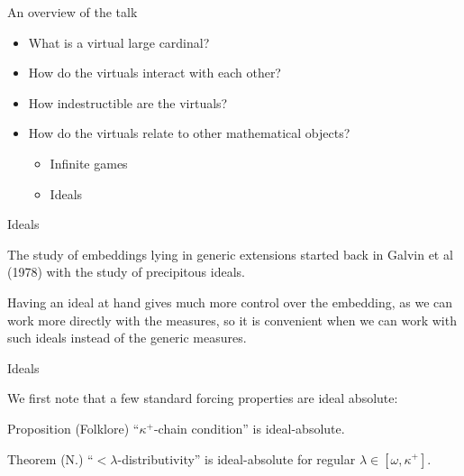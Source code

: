 \documentclass{beamer}
\begin{document}
\begin{frame}{An overview of the talk}
  \begin{itemize}
    \item What is a virtual large cardinal?
    \item How do the virtuals interact with each other?
    \item How indestructible are the virtuals?
    \item How do the virtuals relate to other mathematical objects?
      \begin{itemize}
        \item Infinite games
        \item<alert@+> Ideals
      \end{itemize}
  \end{itemize}
\end{frame}

\begin{frame}{Ideals}

  The study of embeddings lying in generic extensions started back in Galvin et al (1978) with the study of \alert<1>{precipitous ideals}.

  Having an ideal at hand gives much more control over the embedding, as we can work more directly with the measures, so it is convenient when we can work with such ideals instead of the generic measures. 



\end{frame}

\begin{frame}{Ideals}

  We first note that a few standard forcing properties are ideal absolute:

  \begin{block}{Proposition (Folklore)}
    ``$\kappa^+$-chain condition'' is ideal-absolute.
  \end{block}

  \begin{block}{Theorem (N.)}
    ``${<}\lambda$-distributivity'' is ideal-absolute for regular $\lambda\in[\omega,\kappa^+]$.
  \end{block}

\end{frame}
\end{document}
